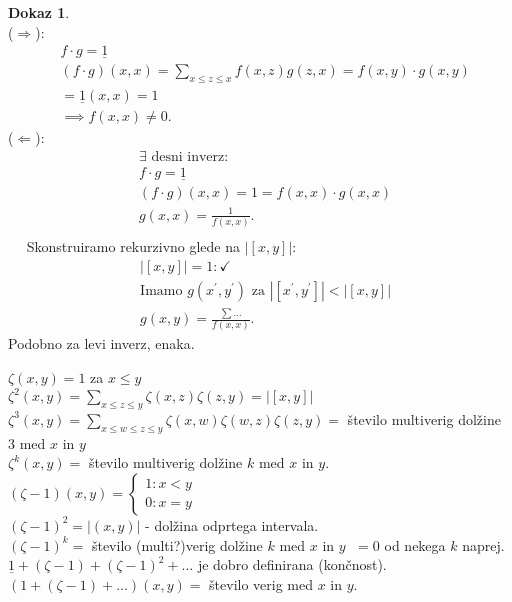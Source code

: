 \documentclass[a4paper, 12pt]{book}
\theoremstyle{definition}
\newtheorem{pro}[counter]{Dokaz}
\theoremstyle{remark}
\begin{document}
\begin{pro} \text{} \\
  ($\Rightarrow$):
  \begin{align*}
    &f \cdot g = \underline{1} \\
    &(f \cdot g)(x,x) = \sum_{x \leq z \leq x} f(x,z) g(z,x) = f(x,y) \cdot g(x,y) \\
    &= \underline{1}(x,x) = 1 \\
    &\implies f(x,x) \neq 0.
  \end{align*}
  ($\Leftarrow$):
  \begin{align*}
    &\exists \text{ desni inverz:} \\
    &f \cdot g = \underline{1} \\
    &(f \cdot g)(x,x) = 1 = f(x,x) \cdot g(x,x) \\
    &g(x,x) = \frac{1}{f(x,x)}. \\
  \end{align*}
  $\quad$ Skonstruiramo rekurzivno glede na $\left|[x,y]\right|$:
  \begin{align*}
    &|[x,y]| = 1: \checkmark \\
    &\text{Imamo } g(x^{'}, y^{'}) \text{ za } |[x^{'}, y^{'}]| < |[x,y]| \\
    &g(x,y) = \frac{\sum \dots}{f(x,x)}.
  \end{align*}
  Podobno za levi inverz, enaka.
\end{pro}
$\zeta(x,y) = 1$ za $x \leq y$ \\
$\zeta^2(x,y) = \sum_{x \leq z \leq y} \zeta(x,z) \zeta(z,y) = \left|[x,y]\right|$ \\
$\zeta^3(x,y) = \sum_{x \leq w \leq z \leq y} \zeta(x,w) \zeta(w,z) \zeta(z,y) =$
število multiverig dolžine $3$ med $x$ in $y$ \\
$\zeta^k(x,y) =$ število multiverig dolžine $k$ med $x$ in $y$. \\
$(\zeta-1)(x,y) = \begin{cases}
  1: x < y \\
  0: x = y
\end{cases}$ \\
$(\zeta-1)^2 = \left|(x,y)\right|$ - dolžina odprtega intervala. \\
$(\zeta-1)^k =$ število (multi?)verig dolžine $k$ med $x$ in $y \;$ $= 0$ od nekega $k$ naprej. \\
$\underline{1} + (\zeta-1) + (\zeta-1)^2 + \dots$ je dobro definirana (končnost). \\
$(1 + (\zeta-1) + \dots)(x,y) =$ število verig med $x$ in $y$. \\
\end{document}
